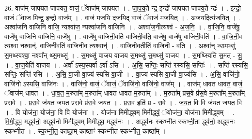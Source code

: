 \documentclass[17pt]{extarticle}
\begin{document}
26. वाज॑म् जापयत जापयत॒ वाजं॒ ॅवाज॑म् जापयत । . जा॒प॒य॒ते न्द्र॒ इन्द्रो॑ जापयत जापय॒ते न्द्रः॑ । . इन्द्रो॒ वाजं॒ ॅवाज॒ मिन्द्र॒ इन्द्रो॒ वाज᳚म् । . वाज॑ मजयि दजयि॒द् वाजं॒ ॅवाज॑ मजयित् । . अ॒ज॒य॒दित्य॑जयित् । . अश्वा॑जनि वाजिनि वाजि॒ न्यश्वा॑ज॒ न्यश्वा॑जनि वाजिनि । . अश्वा॑ज॒नीत्यश्व॑ - अ॒ज॒नि॒ । . वा॒जि॒नि॒ वाजे॑षु॒ वाजे॑षु वाजिनि वाजिनि॒ वाजे॑षु । . वाजे॑षु वाजिनी॒वति॑ वाजिनी॒वति॒ वाजे॑षु॒ वाजे॑षु वाजिनी॒वति॑ । . वा॒जि॒नी॒व त्यश्वा॒ नश्वान्॑. वाजिनी॒वति॑ वाजिनी॒व त्यश्वान्॑ । . वा॒जि॒नी॒व॒तीति॑ वाजिनी - व॒ति॒ । . अश्वा᳚न् थ्स॒मथ्सु॑ स॒मथ्स्वश्वा॒ नश्वा᳚न् थ्स॒मथ्सु॑ । . स॒मथ्सु॑ वाजय वाजय स॒मथ्सु॑ स॒मथ्सु॑ वाजय । . स॒मथ्स्विति॑ स॒मत् - सु॒ । . वा॒ज॒येति॑ वाजय । . अर्वा᳚ ऽस्य॒स्यर्वा ऽर्वा॑ ऽसि । . अ॒सि॒ सप्तिः॒ सप्ति॑ रस्यसि॒ सप्तिः॑ । . सप्ति॑ रस्यसि॒ सप्तिः॒ सप्ति॑ रसि । . अ॒सि॒ वा॒जी वा॒ज्य॑ स्यसि वा॒जी । . वा॒ज्य॑ स्यसि वा॒जी वा॒ज्य॑सि । . अ॒सि॒ वाजि॑नो॒ वाजि॑नो ऽस्यसि॒ वाजि॑नः । . वाजि॑नो॒ वाजं॒ ॅवाजं॒ ॅवाजि॑नो॒ वाजि॑नो॒ वाज᳚म् । . वाज॑म् धावत धावत॒ वाजं॒ ॅवाज॑म् धावत । . धा॒व॒त॒ म॒रुता᳚म् म॒रुता᳚म् धावत धावत म॒रुता᳚म् । . म॒रुता᳚म् प्रस॒वे प्र॑स॒वे म॒रुता᳚म् म॒रुता᳚म् प्रस॒वे । . प्र॒स॒वे ज॑यत जयत प्रस॒वे प्र॑स॒वे ज॑यत । . प्र॒स॒व इति॑ प्र - स॒वे । . ज॒य॒त॒ वि वि ज॑यत जयत॒ वि । . वि योज॑ना॒ योज॑ना॒ वि वि योज॑ना । . योज॑ना मिमीद्ध्वम् मिमीद्ध्वं॒ ॅयोज॑ना॒ योज॑ना मिमीद्ध्वम् । . मि॒मी॒द्ध्व॒ मद्ध्व॑नो॒ अद्ध्व॑नो मिमीद्ध्वम् मिमीद्ध्व॒ मद्ध्व॑नः । . अद्ध्व॑नः स्कभ्नीत स्कभ्नी॒ता द्ध्व॑नो॒ अद्ध्व॑नः स्कभ्नीत । . स्क॒भ्नी॒त॒ काष्ठा॒म् काष्ठाꣳ॑ स्कभ्नीत स्कभ्नीत॒ काष्ठा᳚म् । \newline
\end{document}
